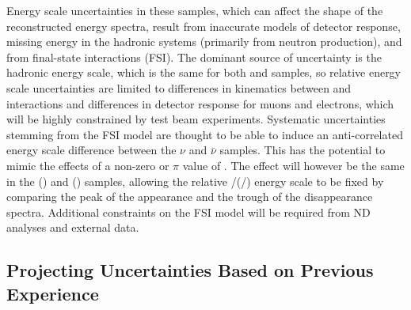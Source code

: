 
Energy scale uncertainties in these samples, which can affect the shape of the reconstructed energy spectra,
result from
inaccurate models of detector response, missing energy in the hadronic systems (primarily from neutron production),
and from final-state interactions (FSI). The dominant source of uncertainty is the hadronic energy scale,
which is the same for both \nue and \numu samples, so relative energy scale uncertainties are limited to
differences in kinematics between \numu and \nue interactions and differences in detector response for
muons and electrons, which will be highly constrained by test beam experiments.
Systematic uncertainties stemming from the FSI model are thought to be able to induce an anti-correlated 
energy scale difference between the $\nu$ and $\bar\nu$ samples. This has the potential to mimic the effects
of a non-zero or $\pi$ value of \deltacp. The effect will however be the same in the \nue (\anue) and \numu
(\anumu) samples, allowing the relative \nue/\numu (\anue/\anumu) energy scale to be fixed by comparing
the peak of the appearance and the trough of the disappearance spectra. Additional constraints on the FSI 
model will be required from ND analyses and external data.

\subsection{Projecting Uncertainties Based on Previous Experience}

